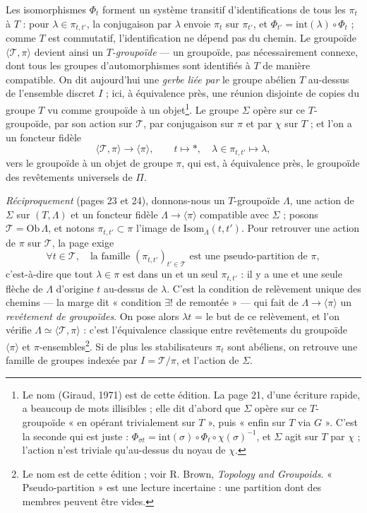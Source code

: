 \documentclass[11pt,a4paper]{article}
\begin{document}
Les isomorphismes $\Phi_t$ forment un système transitif d'identifications de
tous les $\pi_t$ à $T$ : pour $\lambda \in \pi_{t,t'}$, la conjugaison par
$\lambda$ envoie $\pi_t$ sur $\pi_{t'}$, et $\Phi_{t'} = \mathrm{int}(\lambda)
\circ \Phi_t$ ; comme $T$ est commutatif, l'identification ne dépend pas du
chemin. Le groupoïde $\langle \mathcal{T}, \pi\rangle$ devient ainsi un
\emph{$T$-groupoïde} — un groupoïde, pas nécessairement connexe, dont tous les
groupes d'automorphismes sont identifiés à $T$ de manière compatible. On dit
aujourd'hui une \emph{gerbe liée par} le groupe abélien $T$ au-dessus de
l'ensemble discret $I$ ; ici, à équivalence près, une réunion disjointe de
copies du groupe $T$ vu comme groupoïde à un objet\footnote{Le nom (Giraud,
1971) est de cette édition. La page 21, d'une écriture rapide, a beaucoup de
mots illisibles ; elle dit d'abord que $\Sigma$ opère sur ce $T$-groupoïde « en
opérant trivialement sur $T$ », puis « enfin sur $T$ via $G$ ». C'est la
seconde qui est juste : $\Phi_{\sigma t} = \mathrm{int}(\sigma) \circ \Phi_t
\circ \chi(\sigma)^{-1}$, et $\Sigma$ agit sur $T$ par $\chi$ ; l'action n'est
triviale qu'au-dessus du noyau de $\chi$.}. Le groupe $\Sigma$ opère sur ce
$T$-groupoïde, par son action sur $\mathcal{T}$, par conjugaison sur $\pi$ et
par $\chi$ sur $T$ ; et l'on a un foncteur fidèle
\[
\langle \mathcal{T}, \pi\rangle \longrightarrow \langle \pi\rangle, \qquad t
\longmapsto \ast, \quad \lambda \in \pi_{t,t'} \longmapsto \lambda,
\]
vers le groupoïde à un objet de groupe $\pi$, qui est, à équivalence près, le
groupoïde des revêtements universels de $\Pi$.

\emph{Réciproquement} (pages 23 et 24), donnons-nous un $T$-groupoïde
$\Lambda$, une action de $\Sigma$ sur $(T, \Lambda)$ et un foncteur fidèle
$\Lambda \to \langle \pi\rangle$ compatible avec $\Sigma$ ; posons $\mathcal{T}
= \mathrm{Ob}\,\Lambda$, et notons $\pi_{t,t'} \subset \pi$ l'image de
$\mathrm{Isom}_\Lambda(t, t')$. Pour retrouver une action de $\pi$ sur
$\mathcal{T}$, la page exige
\[
\forall t \in \mathcal{T}, \quad \text{la famille } (\pi_{t,t'})_{t' \in
\mathcal{T}} \text{ est une pseudo-partition de } \pi,
\]
c'est-à-dire que tout $\lambda \in \pi$ est dans un et un seul $\pi_{t,t'}$ :
il y a une et une seule flèche de $\Lambda$ d'origine $t$ au-dessus de
$\lambda$. C'est la condition de relèvement unique des chemins — la marge dit
« condition $\exists!$ de remontée » — qui fait de $\Lambda \to \langle\pi\rangle$
un \emph{revêtement de groupoïdes}. On pose alors $\lambda t$ = le but de ce
relèvement, et l'on vérifie $\Lambda \simeq \langle \mathcal{T}, \pi\rangle$ :
c'est l'équivalence classique entre revêtements du groupoïde
$\langle\pi\rangle$ et $\pi$-ensembles\footnote{Le nom est de cette édition ;
voir R. Brown, \emph{Topology and Groupoids}. « Pseudo-partition » est une
lecture incertaine : une partition dont des membres peuvent être vides.}. Si
de plus les stabilisateurs $\pi_t$ sont abéliens, on retrouve une famille de
groupes indexée par $I = \mathcal{T}/\pi$, et l'action de $\Sigma$.
\end{document}
